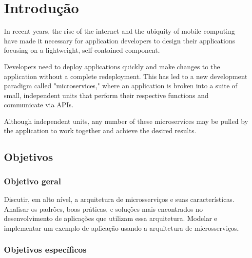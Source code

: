 \chapter{Introdução}\label{chapter-introducao}

In recent years, the rise of the internet and the ubiquity of mobile computing have made it necessary for application developers to design their applications focusing on a lightweight, self-contained component.

Developers need to deploy applications quickly and make changes to the application without a complete redeployment. This has led to a new development paradigm called "microservices," where an application is broken into a suite of small, independent units that perform their respective functions and communicate via APIs.

Although independent units, any number of these microservices may be pulled by the application to work together and achieve the desired results. \cite{noauthor_what_nodate}


\section{Objetivos}\label{sec-objetivos}


\subsection{Objetivo geral}\label{sec-objetivo-geral}

Discutir, em alto nível, a arquitetura de microsserviços e suas características. Analisar os padrões, boas práticas, e soluções mais encontrados no desenvolvimento de aplicações que utilizam essa arquitetura. Modelar e implementar um exemplo de aplicação usando a arquitetura de microsserviços.

\subsection{Objetivos específicos}\label{sec-objetivos-especificos}

